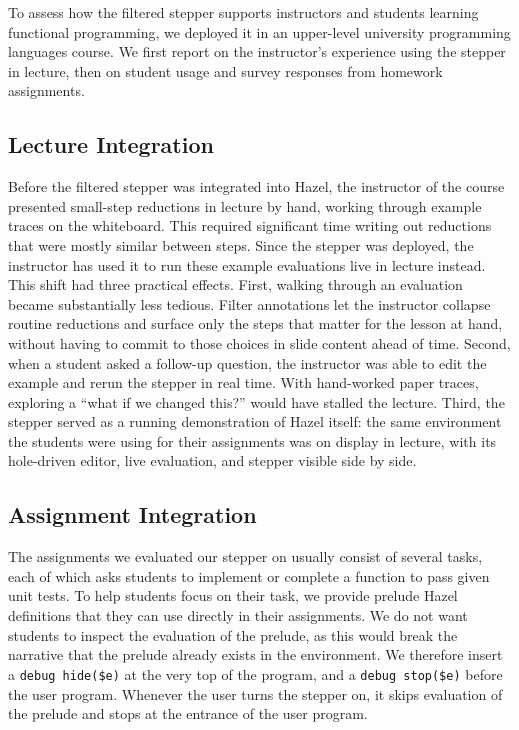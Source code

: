 
To assess how the filtered stepper supports instructors and students
learning functional programming, we deployed it in an upper-level
university programming languages course. We first report on the
instructor's experience using the stepper in lecture, then on student
usage and survey responses from homework assignments.

\subsection{Lecture Integration}

Before the filtered stepper was integrated into Hazel, the instructor
of the course presented small-step reductions in lecture by hand,
working through example traces on the whiteboard. This required significant
time writing out reductions that were mostly similar between steps.
Since the stepper was deployed, the instructor has
used it to run these example evaluations live in lecture instead.
This shift had three practical effects. First, walking through an
evaluation became substantially less tedious. Filter annotations
let the instructor collapse routine reductions and surface only the
steps that matter for the lesson at hand, without having to commit
to those choices in slide content ahead of time. Second, when a
student asked a follow-up question, the instructor was able to edit the
example and rerun the stepper in real time. With hand-worked paper
traces, exploring a ``what if we changed this?'' would have stalled
the lecture. Third, the
stepper served as a running demonstration of Hazel itself: the same
environment the students were using for their assignments was on
display in lecture, with its hole-driven editor, live evaluation,
and stepper visible side by side.

\subsection{Assignment Integration}

The assignments we evaluated our stepper on usually consist of several tasks, each of which asks students to implement or complete a function to pass given unit tests. To help students focus on their task, we provide prelude Hazel definitions that they can use directly in their assignments. We do not want students to inspect the evaluation of the prelude, as this would break the narrative that the prelude already exists in the environment. We therefore insert a \lstinline[language=hazel]{debug hide($e)} at the very top of the program, and a \lstinline[language=hazel]{debug stop($e)} before the user program. Whenever the user turns the stepper on, it skips evaluation of the prelude and stops at the entrance of the user program.

